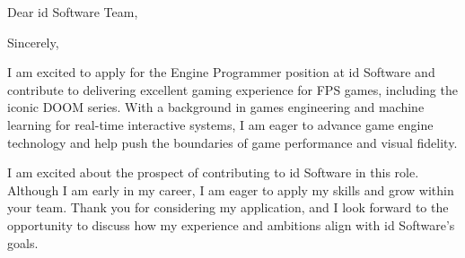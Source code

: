 \documentclass[12pt,a4paper]{moderncv}
\makeatletter
\newcommand*{\subject}[1]{\def\@subject{#1}}
\makeatother
\begin{document}
\date{Würzburg, \today}%
\subject{Application for Engine Programmer (Frankfurt, Job ID 2021-2042)}
\opening{Dear id Software Team,}
    
\closing{Sincerely,}

\makelettertitle
I am excited to apply for the Engine Programmer position at id Software and contribute to delivering excellent 
gaming experience for FPS games, including the iconic DOOM series. 
With a background in games engineering and machine learning for real-time interactive systems, 
I am eager to advance game engine technology and help push the boundaries of game performance and visual fidelity.

 

 



I am excited about the prospect of contributing to id Software in this role. 
Although I am early in my career, 
I am eager to apply my skills and grow within your team. 
Thank you for considering my application, 
and I look forward to the opportunity to discuss how my experience and ambitions align with id Software’s goals.
\vspace{0.5cm}


\makeletterclosing
\end{document}
